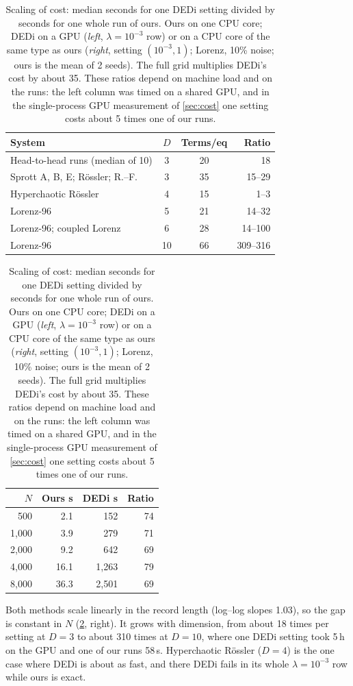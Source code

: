 \begin{table}[t]
\centering
\caption{Scaling of cost: median seconds for one DEDi setting divided by seconds for one whole run of ours. Ours on one CPU core; DEDi on a GPU (\emph{left}, $\lambda=10^{-3}$ row) or on a CPU core of the same type as ours (\emph{right}, setting $(10^{-3},1)$; Lorenz, 10\% noise; ours is the mean of 2 seeds). The full grid multiplies DEDi's cost by about 35. These ratios depend on machine load and on the runs: the left column was timed on a shared GPU, and in the single-process GPU measurement of \cref{sec:cost} one setting costs about 5 times one of our runs.}
\label{tab:anatomy}
\small
\begin{tabular}[t]{@{}lccr@{}}
\toprule
System & $D$ & Terms/eq & Ratio \\
\midrule
Head-to-head runs (median of 10) & 3 & 20 & 18 \\
Sprott A, B, E; R\"ossler; R.--F. & 3 & 35 & 15--29 \\
Hyperchaotic R\"ossler & 4 & 15 & 1--3 \\
Lorenz-96 & 5 & 21 & 14--32 \\
Lorenz-96; coupled Lorenz & 6 & 28 & 14--100 \\
Lorenz-96 & 10 & 66 & 309--316 \\
\bottomrule
\end{tabular}
\quad
\begin{tabular}[t]{@{}rrrr@{}}
\toprule
$N$ & Ours s & DEDi s & Ratio \\
\midrule
500 & 2.1 & 152 & 74 \\
1{,}000 & 3.9 & 279 & 71 \\
2{,}000 & 9.2 & 642 & 69 \\
4{,}000 & 16.1 & 1{,}263 & 79 \\
8{,}000 & 36.3 & 2{,}501 & 69 \\
\bottomrule
\end{tabular}
\end{table}

Both methods scale linearly in the record length (log--log slopes 1.03), so the gap is constant in $N$ (\cref{tab:anatomy}, right). It grows with dimension, from about 18 times per setting at $D=3$ to about 310 times at $D=10$, where one DEDi setting took 5\,h on the GPU and one of our runs 58\,s. Hyperchaotic R\"ossler ($D=4$) is the one case where DEDi is about as fast, and there DEDi fails in its whole $\lambda=10^{-3}$ row while ours is exact.

